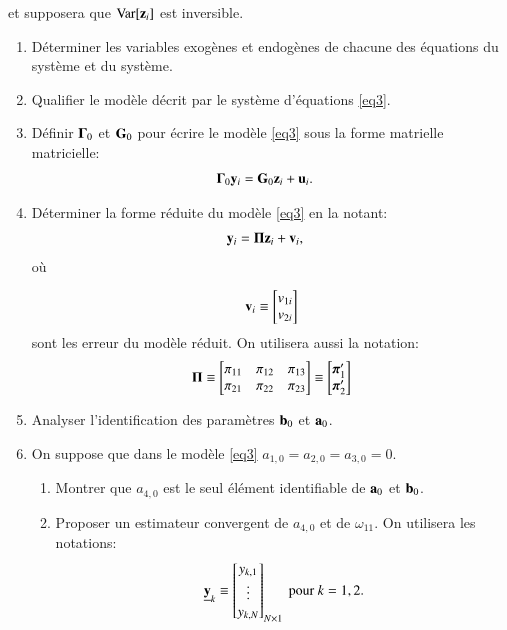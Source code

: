 \documentclass[10pt, reqno]{amsart}
\begin{document}
    et supposera que $\operatorname{Var}[{\mathbf z}_i]$ est inversible.
\begin{enumerate}
    \item Déterminer les variables exogènes et endogènes de chacune des équations
    du système et du système.
    \item Qualifier le modèle décrit par le système d’équations \eqref{eq3}.
    \item Définir ${\boldsymbol \Gamma}_0$ et $\mathbf G_0$ pour écrire le modèle \eqref{eq3} sous la forme matrielle matricielle:
    \begin{align*}
    {\boldsymbol \Gamma}_0{\mathbf y}_i&= \mathbf G_0{\mathbf z}_i + {\mathbf u}_i.
    \end{align*}
    \item Déterminer la forme réduite du modèle \eqref{eq3} en la notant: 
    \begin{align*}
        {\mathbf y}_i &={\boldsymbol \Pi}{\mathbf z}_i + {\mathbf v}_i,
    \end{align*}
où 

\[{\mathbf v}_i \equiv \begin{bmatrix}
v_{1i}\\
v_{2i}
\end{bmatrix}
\]
sont les erreur du modèle réduit. On utilisera aussi la notation:
\[  
    {\boldsymbol \Pi} \equiv \begin{bmatrix}
        \pi_{11}& \pi_{12}& \pi_{13}\\
        \pi_{21}& \pi_{22}& \pi_{23}
    \end{bmatrix}
    \equiv 
    \begin{bmatrix}
{\boldsymbol \pi}_1^\prime\\
{\boldsymbol \pi}_2^\prime
    \end{bmatrix}
\]
\item Analyser l’identification des paramètres ${\mathbf b}_0$ et ${\mathbf a}_0$.
\item On suppose que dans le modèle \eqref{eq3} $a_{1,0}= a_{2,0}= a_{3,0}= 0$.
\begin{enumerate}
\item Montrer que $a_{4,0}$ est le seul élément identifiable de ${\mathbf a}_0$ et ${\mathbf b}_0$.  
\item Proposer un estimateur convergent de $a_{4,0}$ et de $\omega_{11}$. On utilisera les notations:
\[
  \underline{{\mathbf y}}_k \equiv
  \begin{bmatrix}
      y_{k, 1}\\
      \vdots\\
      y_{k, N}
  \end{bmatrix}_{N\times 1} 
  \ \text{pour} \ k = 1, 2.
\]


\end{enumerate}
\end{enumerate}
\end{document}
